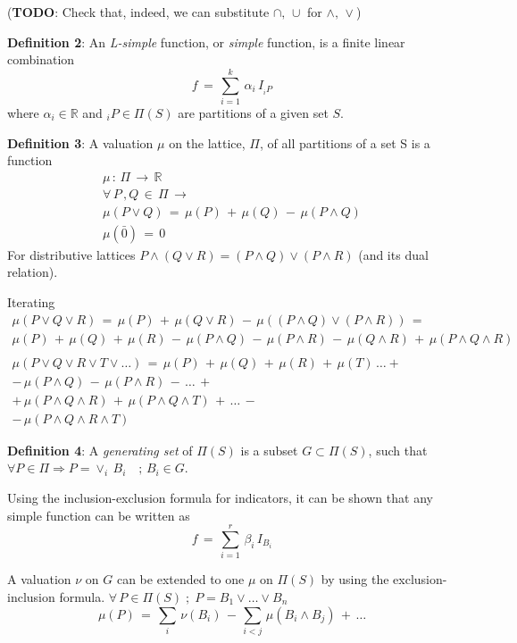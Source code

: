 \documentclass[12pt]{amsart}
\begin{document}
(\textbf{TODO}: Check that, indeed, we can substitute $\cap,\,\cup$ for $\wedge,\,\vee$) 

\textbf{Definition 2}: An \textit{L-simple} function, or \textit{simple} function, is a finite  linear combination 
\[
f\,=\,\sum_{i=1}^k\,\alpha_i\,I_{{}_iP}
\]
where $\alpha_i\in\mathbb{R}$ and  ${}_iP\in\Pi(S)$ are partitions of a given set $S$.
 
{\bf Definition 3}: A valuation $\mu$ on the lattice, $\Pi$, of all partitions of a set S is a function
\[ 
\begin{array}{c}
\mu \, : \, \Pi \, \longrightarrow \, \mathbb{R}  
\\
\forall \, P\,,Q\,\in\,\Pi \, \rightarrow \, \\
\mu(P\vee Q) \,=\, \mu(P)\,+\,\mu(Q)\,-\,\mu(P\wedge Q)
\\
\mu(\bar{0}) \,=\,0 
\end{array}
\]
For distributive lattices $P\wedge(Q\vee R) = (P\wedge Q)\vee (P\wedge R)$ (and its dual relation).

Iterating
\[
\begin{array}{l}
\mu(P\vee Q\vee R)\,=\,\mu(P)\,+\,\mu(Q\vee R)\,-\,\mu( (P\wedge Q)\vee (P\wedge R))\,=\,
\\
\mu(P)\,+\,\mu(Q)\,+\,\mu(R)\,-\,\mu(P\wedge Q)\,-\,\mu(P\wedge R)\,-\,\mu(Q\wedge R)\,+\,
\mu(P\wedge Q\wedge R)\\
\\
\mu(P\vee Q\vee R\vee T\vee \dots) \,=\,

\mu(P)\,+\,\mu(Q)\,+\,\mu(R)\,+\,\mu(T)\,\dots + \\
-\,\mu(P\wedge Q)\,-\,\mu(P\wedge R)\,-\,\dots \,+ \\
+\,\mu(P\wedge Q\wedge R)\,+\,\mu(P\wedge Q\wedge T)\,+\,\dots\,-\\
-\,\mu(P\wedge Q\wedge R\wedge T)

\end{array}
\]

\textbf{Definition 4}: A \textit{generating set} of $\Pi(S)$ is a subset $G\subset \Pi(S)$, such that $\forall P\in\Pi \Rightarrow P=\vee_i\, B_i\quad; \,B_i\in G$.

Using the inclusion-exclusion formula for indicators, it can be shown that any simple function can be written as 
\[
f\,=\,\sum_{i=1}^r\,\beta_i\,I_{B_i}
\]

A valuation $\nu$ on $G$ can be extended to one $\mu$ on $\Pi(S)$ by using the exclusion-inclusion formula. $\forall\,P\in\Pi(S)\;;\;P=B_1\vee\dots\vee B_n$
\[
\mu(P)\,=\,\sum_i\,\nu(B_i)\,-\,\sum_{i<j}\,\mu(B_i\wedge B_j)\,+\,\dots
\]
\end{document}
